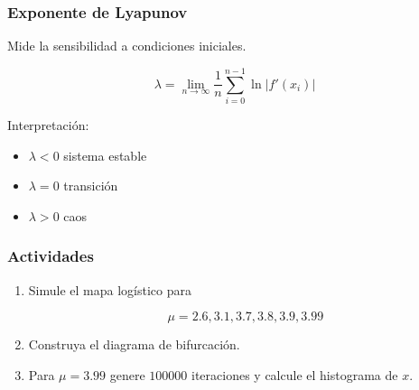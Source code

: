 \begin{frame}
\frametitle{Exponente de Lyapunov}

Mide la sensibilidad a condiciones iniciales.

\[
\lambda =
\lim_{n\to\infty}
\frac{1}{n}
\sum_{i=0}^{n-1}
\ln |f'(x_i)|
\]

Interpretación:

\begin{itemize}
\item $\lambda<0$ sistema estable
\item $\lambda=0$ transición
\item $\lambda>0$ caos
\end{itemize}

\end{frame}


\begin{frame}
\frametitle{Actividades}

\begin{enumerate}

\item Simule el mapa logístico para

\[
\mu=2.6,3.1,3.7,3.8,3.9,3.99
\]

\item Construya el diagrama de bifurcación.

\item Para $\mu=3.99$ genere $100000$ iteraciones
y calcule el histograma de $x$.

\end{enumerate}

\end{frame}


